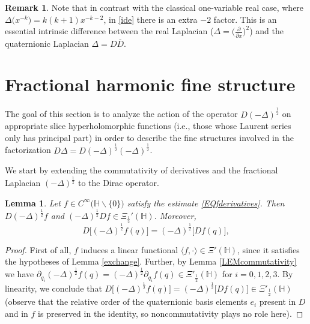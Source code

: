 \documentclass[reqno,11pt]{amsart}
\newtheorem{lemma}[theorem]{Lemma}
\theoremstyle{definition}
\newtheorem{remark}[theorem]{Remark}
\begin{document}
\begin{remark}
	Note that in contrast with the classical one-variable real case, where $\Delta \big( x^{-k}\big)=k(k+1)x^{-k-2}$, in \eqref{ide} there is an extra $-2$ factor. This is an essential intrinsic difference between the real Laplacian ($\Delta=\big(\frac{\partial}{\partial x}\big)^2$) and the quaternionic Laplacian $\Delta=D\overline{D}$.
\end{remark}








\section{Fractional harmonic fine structure}\label{Fractionalharmonic}




The goal of this section is to analyze the action of the operator $D(-\Delta)^{\frac{1}{2}}$ on appropriate slice hyperholomorphic functions (i.e., those whose Laurent series only has principal part) in order to describe the fine structures involved in the  factorization $D\Delta=D(-\Delta)^\frac{1}{2}(-\Delta)^\frac{1}{2}$.

\medskip



We start by extending the commutativity of derivatives and the fractional Laplacian $(-\Delta)^{\frac{1}{2}}$ to the Dirac operator.

\begin{lemma}
	\label{NN}
	Let $f \in C^\infty \big(\mathbb{H} \backslash \{0\}\big)$ satisfy the estimate \eqref{EQfderivatives}. Then $D(-\Delta)^{\frac{1}{2}}f$ and $(-\Delta)^{\frac{1}{2}}Df \in \Xi_{\frac{1}{2}}'(\mathbb{H})$. Moreover,
	\begin{equation*}
		D\big[(-\Delta)^{\frac{1}{2}}f(q)\big]=(-\Delta)^{\frac{1}{2}}\big[Df(q)\big],
	\end{equation*}
\end{lemma}
\begin{proof}
	First of all, $f$ induces a linear functional $\langle f,\cdot \rangle \in \Xi'(\mathbb{H})$, since it satisfies the hypotheses of Lemma \ref{exchange}. Further, by Lemma \ref{LEMcommutativity} we have $\partial_{q_i}  (-\Delta)^{\frac{1}{2}}f(q)=(-\Delta)^{\frac{1}{2}}\partial_{q_i}f(q)\in \Xi'_\frac{1}{2}(\mathbb{H})$ for $i=0,1,2,3$. By linearity, we conclude that $D\big[(-\Delta)^{\frac{1}{2}}f(q)\big]=(-\Delta)^{\frac{1}{2}}\big[Df(q)\big]\in \Xi'_\frac{1}{2}(\mathbb{H})$ (observe that the relative order of the quaternionic basis elements $e_i$ present in $D$ and in $f$ is preserved in the identity, so noncommutativity plays no role here).
\end{proof}
\end{document}
